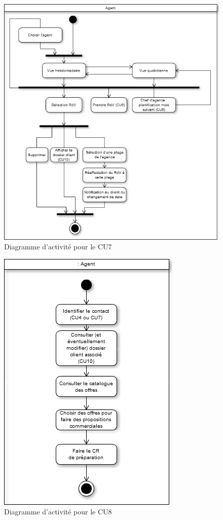 \begin{figure}[H]
	\begin{center}
		\includegraphics[scale=0.4]{Includes/SOA-Activite-CU7.png}
		\caption{Diagramme d'activité pour le CU7}
	\end{center}
\end{figure}

\begin{figure}[H]
	\begin{center}
		\includegraphics[scale=0.4]{Includes/SOA-Activite-CU8.png}
		\caption{Diagramme d'activité pour le CU8}
	\end{center}
\end{figure}

